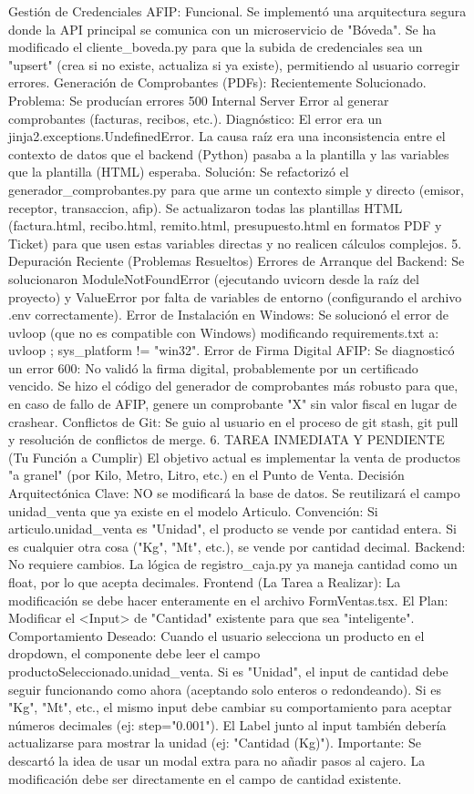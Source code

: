 Gestión de Credenciales AFIP: Funcional. Se implementó una arquitectura segura donde la API principal se comunica con un microservicio de "Bóveda". Se ha modificado el cliente_boveda.py para que la subida de credenciales sea un "upsert" (crea si no existe, actualiza si ya existe), permitiendo al usuario corregir errores.
Generación de Comprobantes (PDFs): Recientemente Solucionado.
Problema: Se producían errores 500 Internal Server Error al generar comprobantes (facturas, recibos, etc.).
Diagnóstico: El error era un jinja2.exceptions.UndefinedError. La causa raíz era una inconsistencia entre el contexto de datos que el backend (Python) pasaba a la plantilla y las variables que la plantilla (HTML) esperaba.
Solución: Se refactorizó el generador_comprobantes.py para que arme un contexto simple y directo (emisor, receptor, transaccion, afip). Se actualizaron todas las plantillas HTML (factura.html, recibo.html, remito.html, presupuesto.html en formatos PDF y Ticket) para que usen estas variables directas y no realicen cálculos complejos.
5. Depuración Reciente (Problemas Resueltos)
Errores de Arranque del Backend: Se solucionaron ModuleNotFoundError (ejecutando uvicorn desde la raíz del proyecto) y ValueError por falta de variables de entorno (configurando el archivo .env correctamente).
Error de Instalación en Windows: Se solucionó el error de uvloop (que no es compatible con Windows) modificando requirements.txt a: uvloop ; sys_platform != "win32".
Error de Firma Digital AFIP: Se diagnosticó un error 600: No validó la firma digital, probablemente por un certificado vencido. Se hizo el código del generador de comprobantes más robusto para que, en caso de fallo de AFIP, genere un comprobante "X" sin valor fiscal en lugar de crashear.
Conflictos de Git: Se guio al usuario en el proceso de git stash, git pull y resolución de conflictos de merge.
6. TAREA INMEDIATA Y PENDIENTE (Tu Función a Cumplir)
El objetivo actual es implementar la venta de productos "a granel" (por Kilo, Metro, Litro, etc.) en el Punto de Venta.
Decisión Arquitectónica Clave: NO se modificará la base de datos. Se reutilizará el campo unidad_venta que ya existe en el modelo Articulo.
Convención:
Si articulo.unidad_venta es "Unidad", el producto se vende por cantidad entera.
Si es cualquier otra cosa ("Kg", "Mt", etc.), se vende por cantidad decimal.
Backend: No requiere cambios. La lógica de registro_caja.py ya maneja cantidad como un float, por lo que acepta decimales.
Frontend (La Tarea a Realizar): La modificación se debe hacer enteramente en el archivo FormVentas.tsx.
El Plan: Modificar el <Input> de "Cantidad" existente para que sea "inteligente".
Comportamiento Deseado:
Cuando el usuario selecciona un producto en el dropdown, el componente debe leer el campo productoSeleccionado.unidad_venta.
Si es "Unidad", el input de cantidad debe seguir funcionando como ahora (aceptando solo enteros o redondeando).
Si es "Kg", "Mt", etc., el mismo input debe cambiar su comportamiento para aceptar números decimales (ej: step="0.001"). El Label junto al input también debería actualizarse para mostrar la unidad (ej: "Cantidad (Kg)").
Importante: Se descartó la idea de usar un modal extra para no añadir pasos al cajero. La modificación debe ser directamente en el campo de cantidad existente.